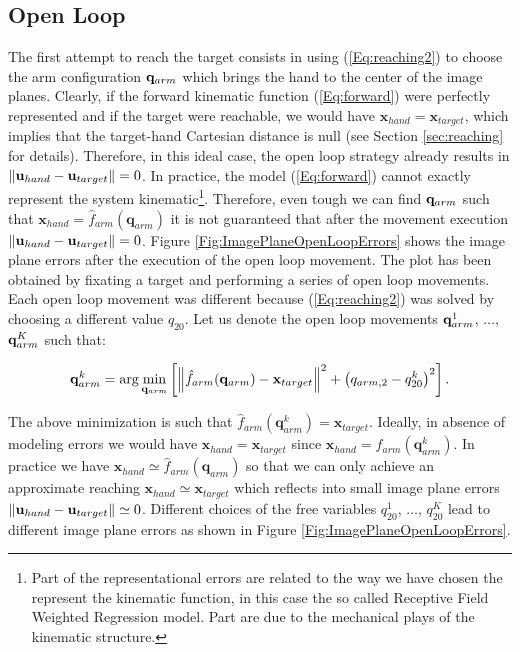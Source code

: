 \subsection{Open Loop}
The first attempt to reach the target consists in using (\ref{Eq:reaching2})
to choose the arm configuration $\mathbf q_{arm}$ which brings the hand to the center 
of the image planes. Clearly, if the forward 
kinematic function (\ref{Eq:forward}) were perfectly represented and if the target were reachable, we would have $\mathbf x_{hand} =  \mathbf x_{target}$, which implies that the target-hand Cartesian distance 
 is null (see Section \ref{sec:reaching} for details). Therefore, in this ideal case, the open loop 
 strategy already results in $\| \mathbf{u}_{hand} - \mathbf{u}_{target} \| = 0$. In practice, the model 
 (\ref{Eq:forward}) cannot exactly represent the system kinematic\footnote{Part of the representational 
 errors are related to the way we have chosen the represent the kinematic function, in this case the
 so called Receptive Field Weighted Regression model. Part are due to the mechanical plays of the
 kinematic structure.}. Therefore, even tough we can find $\mathbf q_{arm}$ such that $\mathbf x_{hand}=
 \hat f_{arm}(\mathbf q_{arm})$ it is not guaranteed that after the movement execution 
 $\| \mathbf{u}_{hand} - \mathbf{u}_{target} \| = 0$. Figure \ref{Fig:ImagePlaneOpenLoopErrors}
 shows the image plane errors after the execution of the open loop movement. The plot has been obtained
 by fixating a target and performing a series of open loop movements. Each open loop
 movement was different because (\ref{Eq:reaching2}) was solved 
 by choosing a different value $q_{20}$. Let us denote the open loop movements $\mathbf q_{arm}^1$, $\dots$, 
 $\mathbf q_{arm}^K$ such that:
 
 \begin{eqnarray} \label{Eq:OpenLoopMovements}
 \mathbf q_{arm}^k = \arg \min_{\mathbf q_{arm}}
  \left[
  \left\| \hat f_{arm}(\mathbf q_{arm}) - \mathbf x_{target}\right\|^2 + \left(q_{arm,2}-q_{20}^k\right)^2
  \right].
 \end{eqnarray}
 
 The above minimization is such that $\hat f_{arm}(\mathbf q_{arm}^k) = \mathbf x_{target}$. Ideally, in absence
 of modeling errors we would have $ \mathbf x_{hand} = \mathbf x_{target}$ since $\mathbf x_{hand} = f_{arm}(\mathbf q_{arm}^k)$. In practice we have $\mathbf x_{hand} \simeq \hat f_{arm}(\mathbf q_{arm})$ 
 so that we can only achieve an approximate reaching $ \mathbf x_{hand} \simeq \mathbf x_{target}$ 
 which reflects into small image plane errors $\| \mathbf{u}_{hand} - \mathbf{u}_{target}\| \simeq 0$. Different choices 
 of the free variables $q_{20}^1$, $\dots$, $q_{20}^K$ lead to different image plane errors as shown 
 in Figure \ref{Fig:ImagePlaneOpenLoopErrors}.



